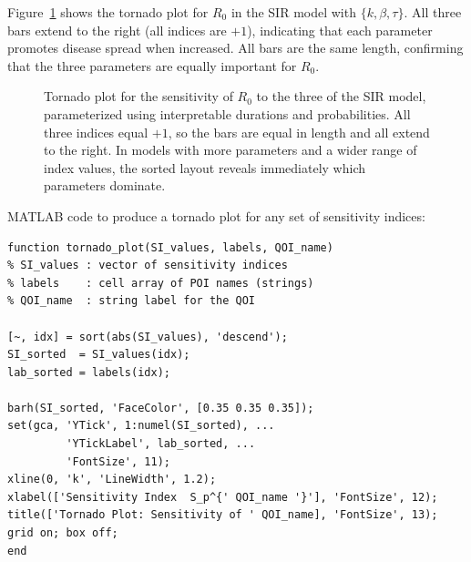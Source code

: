 Figure~\ref{fig:tornado_R0} shows the tornado plot for $R_0$
in the SIR model with \POIs $\{k, \beta, \tau\}$.
All three bars extend to the right (all indices are $+1$),
indicating that each parameter promotes disease spread when increased.
All bars are the same length, confirming that the three parameters
are equally important for $R_0$.

\begin{figure}[htb]
  \centering
  \caption{Tornado plot for the sensitivity of $R_0$ to the three
           \POIs of the SIR model, parameterized using interpretable
           durations and probabilities. All three indices equal $+1$,
           so the bars are equal in length and all extend to the right.
           In models with more parameters and a wider range of index
           values, the sorted layout reveals immediately which
           parameters dominate.}
  \label{fig:tornado_R0}
\end{figure}

MATLAB code to produce a tornado plot for any set of sensitivity indices:

\begin{verbatim}
function tornado_plot(SI_values, labels, QOI_name)
% SI_values : vector of sensitivity indices
% labels    : cell array of POI names (strings)
% QOI_name  : string label for the QOI

[~, idx] = sort(abs(SI_values), 'descend');
SI_sorted  = SI_values(idx);
lab_sorted = labels(idx);

barh(SI_sorted, 'FaceColor', [0.35 0.35 0.35]);
set(gca, 'YTick', 1:numel(SI_sorted), ...
         'YTickLabel', lab_sorted, ...
         'FontSize', 11);
xline(0, 'k', 'LineWidth', 1.2);
xlabel(['Sensitivity Index  S_p^{' QOI_name '}'], 'FontSize', 12);
title(['Tornado Plot: Sensitivity of ' QOI_name], 'FontSize', 13);
grid on; box off;
end
\end{verbatim}

